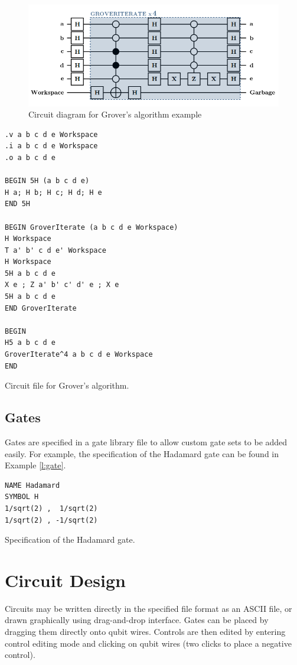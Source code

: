 \documentclass[aps,prl,reprint,floatfix,superscriptaddress]{revtex4-1} %
\begin{document}
\begin{figure}[ht]
\includegraphics[scale=0.50]{grover_circuit}
\caption{Circuit diagram for Grover's algorithm example}
\label{f:grover}
\end{figure}

\begin{program}
\begin{verbatim}
.v a b c d e Workspace
.i a b c d e Workspace
.o a b c d e

BEGIN 5H (a b c d e)
H a; H b; H c; H d; H e
END 5H

BEGIN GroverIterate (a b c d e Workspace)
H Workspace
T a' b' c d e' Workspace
H Workspace
5H a b c d e
X e ; Z a' b' c' d' e ; X e
5H a b c d e
END GroverIterate

BEGIN
H5 a b c d e
GroverIterate^4 a b c d e Workspace
END
\end{verbatim}
\caption{Circuit file for Grover's algorithm.}
\label{l:circuit}
\end{program}
\subsection{Gates}\label{sub:gates}
Gates are specified in a gate library file to allow custom gate sets to be added easily.
For example, the specification of the Hadamard gate can be found in Example \ref{l:gate}.
\begin{program}
\begin{verbatim}
NAME Hadamard
SYMBOL H
1/sqrt(2) ,  1/sqrt(2)
1/sqrt(2) , -1/sqrt(2)
\end{verbatim}
\caption{Specification of the Hadamard gate.}
\label{l:gate}
\end{program}
\section{Circuit Design}
Circuits may be written directly in the specified file format as an ASCII file, or drawn graphically using drag-and-drop interface.  
Gates can be placed by dragging them directly onto qubit wires.
Controls are then edited by entering control editing mode and clicking on qubit wires (two clicks to place a negative control).
\end{document}
